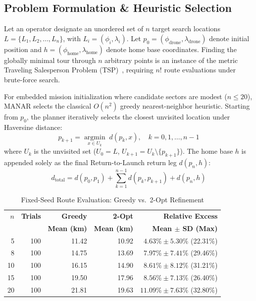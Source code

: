 \subsection{Problem Formulation \& Heuristic Selection}
Let an operator designate an unordered set of $n$ target search locations $L = \{L_1, L_2, \dots, L_n\}$, with $L_i = (\phi_i, \lambda_i)$. Let $p_0 = (\phi_{\mathrm{drone}}, \lambda_{\mathrm{drone}})$ denote initial position and $h = (\phi_{\mathrm{home}}, \lambda_{\mathrm{home}})$ denote home base coordinates. Finding the globally minimal tour through $n$ arbitrary points is an instance of the metric Traveling Salesperson Problem (TSP)~\cite{applegate2006traveling}, requiring $n!$ route evaluations under brute-force search.

For embedded mission initialization where candidate sectors are modest ($n \le 20$), MANAR selects the classical $O(n^2)$ greedy nearest-neighbor heuristic. Starting from $p_0$, the planner iteratively selects the closest unvisited location under Haversine distance:
\begin{equation}
p_{k+1} = \underset{x \in U_k}{\operatorname{argmin}} \; d(p_k, x), \quad k = 0, 1, \dots, n-1
\end{equation}
where $U_k$ is the unvisited set ($U_0 = L$, $U_{k+1} = U_k \setminus \{p_{k+1}\}$). The home base $h$ is appended solely as the final Return-to-Launch return leg $d(p_n, h)$:
\begin{equation}
d_{\mathrm{total}} = d(p_0, p_1) + \sum_{k=1}^{n-1} d(p_k, p_{k+1}) + d(p_n, h)
\end{equation}

\begin{table}[t]
\caption{Fixed-Seed Route Evaluation: Greedy vs.\ 2-Opt Refinement}
\label{tab:route_benchmark}
\centering
\scriptsize
\begin{tabular*}{\columnwidth}{@{\extracolsep{\fill}}rrrrr@{}}
\toprule
\textbf{$n$} & \textbf{Trials} & \textbf{Greedy} & \textbf{2-Opt} & \textbf{Relative Excess} \\
 & & \textbf{Mean (km)} & \textbf{Mean (km)} & \textbf{Mean $\pm$ SD (Max)} \\
\midrule
5 & 100 & 11.42 & 10.92 & $4.63\% \pm 5.30\%$ (22.31\%) \\
8 & 100 & 14.75 & 13.69 & $7.97\% \pm 7.41\%$ (29.46\%) \\
10 & 100 & 16.15 & 14.90 & $8.61\% \pm 8.12\%$ (31.21\%) \\
15 & 100 & 19.50 & 17.96 & $8.56\% \pm 7.13\%$ (26.40\%) \\
20 & 100 & 21.81 & 19.63 & $11.09\% \pm 7.63\%$ (32.80\%) \\
\bottomrule
\end{tabular*}
\end{table}


